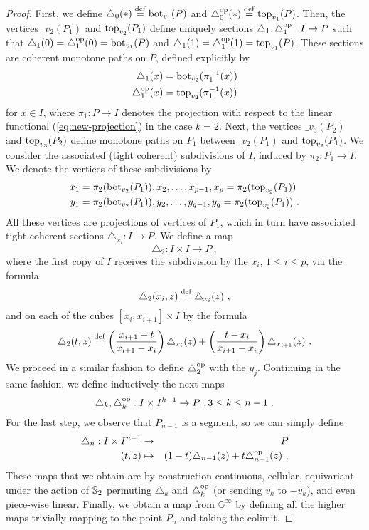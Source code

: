 \begin{proof}
	First, we define $\triangle_0 (*) \stackrel{\mathrm{def}}{=} \operatorname{bot}_{v_1}(P)$ and $\triangle_0^{\mathrm{op}} (*) \stackrel{\mathrm{def}}{=} \operatorname{top}_{v_1}(P)$.
	Then, the vertices $\bm_{v_2}(P_1)$ and $\operatorname{top}_{v_2}(P_1)$ define uniquely sections $\triangle_1, \triangle_1^{\mathrm{op}} : I \to P$ such that $\triangle_1(0)=\triangle_1^{\mathrm{op}}(0)=\operatorname{bot}_{v_1}(P)$ and $\triangle_1(1)=\triangle_1^{\mathrm{op}}(1)=\operatorname{top}_{v_1}(P)$.
	These sections are coherent monotone paths on $P$, defined explicitly by
	\begin{align*}
		\triangle_1(x) & = \operatorname{bot}_{v_2}(\pi_1^{-1}(x)) \\
		\triangle_1^{\mathrm{op}}(x) & = \operatorname{top}_{v_2}(\pi_1^{-1}(x))
	\end{align*}
	for $x \in I$, where $\pi_1 : P \to I$ denotes the projection with respect to the linear functional (\ref{eq:new-projection}) in the case $k=2$.
	Next, the vertices $\bm_{v_3}(P_2)$ and $\operatorname{top}_{v_3}(P_2)$ define monotone paths on $P_1$ between $\bm_{v_2}(P_1)$ and $\operatorname{top}_{v_2}(P_1)$.
	We consider the associated (tight coherent) subdivisions of $I$, induced by $\pi_2 : P_1 \to I$.
	We denote the vertices of these subdivisions by
	\begin{align*}
		x_1 & =\pi_2(\operatorname{bot}_{v_2}(P_1)), x_2, \ldots, x_{p-1}, x_p=\pi_2(\operatorname{top}_{v_2}(P_1)) \\
		y_1 & = \pi_2(\operatorname{bot}_{v_2}(P_1)), y_2, \ldots, y_{q-1}, y_q=\pi_2(\operatorname{top}_{v_2}(P_1)) \ .
	\end{align*}
	All these vertices are projections of vertices of $P_1$, which in turn have associated tight coherent sections $\triangle_{x_i}: I \to P$.
	We define a map
	\[
	\triangle_2 : I \times I \to P \ ,
	\]
	where the first copy of $I$ receives the subdivision by the $x_i$, $1\leq i \leq p$, via the formula
	\[
	\triangle_2(x_i, z) \stackrel{\mathrm{def}}{=} \triangle_{x_i}(z) \ ,
	\]
	and on each of the cubes $[x_i,x_{i+1}]\times I$ by the formula
	\[
	\triangle_2(t,z) \stackrel{\mathrm{def}}{=} \left( \frac{x_{i+1}-t}{x_{i+1}-x_i} \right) \triangle_{x_i}(z) + \left( \frac{t-x_i}{x_{i+1}-x_i} \right) \triangle_{x_{i+1}}(z) \ .
	\]
	We proceed in a similar fashion to define $\triangle_2^{\mathrm{op}}$ with the $y_j$.
	Continuing in the same fashion, we define inductively the next maps
	\[
	\triangle_k, \triangle_k^{\mathrm{op}} : I \times I^{k-1} \to P \ , 3 \leq k \leq n-1 \ .
	\]
	For the last step, we observe that $P_{n-1}$ is a segment, so we can simply define
	\begin{eqnarray*}
		\triangle_n : I \times I^{n-1} & \to & P \\
		(t,z) & \mapsto & (1-t)\triangle_{n-1}(z) + t \triangle_{n-1}^{\mathrm{op}} (z) \ .
	\end{eqnarray*}
	These maps that we obtain are by construction continuous, cellular, equivariant under the action of $\mathbb{S}_2$ permuting $\triangle_k$ and $\triangle_k^{\mathrm{op}}$ (or sending $v_k$ to $-v_k$), and even piece-wise linear.
	Finally, we obtain a map from $\mathbb{G}^\infty$ by defining all the higher maps trivially mapping to the point $P_n$ and taking the colimit.
\end{proof}
